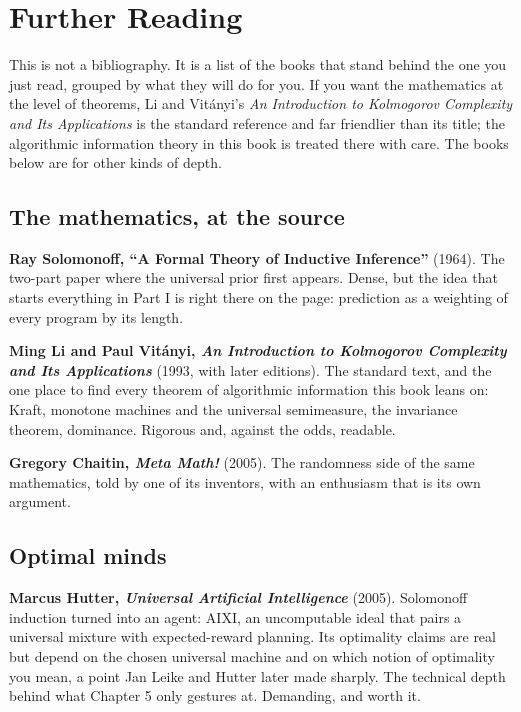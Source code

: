 \chapter*{Further Reading}

This is not a bibliography. It is a list of the books that stand behind the one you just read, grouped by what they will do for you. If you want the mathematics at the level of theorems, Li and Vitányi's \textit{An Introduction to Kolmogorov Complexity and Its Applications} is the standard reference and far friendlier than its title; the algorithmic information theory in this book is treated there with care. The books below are for other kinds of depth.

\section*{The mathematics, at the source}

\textbf{Ray Solomonoff, ``A Formal Theory of Inductive Inference''} (1964). The two-part paper where the universal prior first appears. Dense, but the idea that starts everything in Part I is right there on the page: prediction as a weighting of every program by its length.

\textbf{Ming Li and Paul Vitányi, \textit{An Introduction to Kolmogorov Complexity and Its Applications}} (1993, with later editions). The standard text, and the one place to find every theorem of algorithmic information this book leans on: Kraft, monotone machines and the universal semimeasure, the invariance theorem, dominance. Rigorous and, against the odds, readable.

\textbf{Gregory Chaitin, \textit{Meta Math!}} (2005). The randomness side of the same mathematics, told by one of its inventors, with an enthusiasm that is its own argument.

\section*{Optimal minds}

\textbf{Marcus Hutter, \textit{Universal Artificial Intelligence}} (2005). Solomonoff induction turned into an agent: AIXI, an uncomputable ideal that pairs a universal mixture with expected-reward planning. Its optimality claims are real but depend on the chosen universal machine and on which notion of optimality you mean, a point Jan Leike and Hutter later made sharply. The technical depth behind what Chapter 5 only gestures at. Demanding, and worth it.


